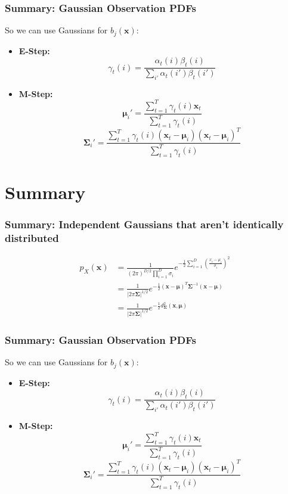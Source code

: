 \documentclass{beamer}
\begin{document}
\begin{frame}
  \frametitle{Summary: Gaussian Observation PDFs}

  So we can use Gaussians for $b_j(\mathbf{x})$:
  \begin{itemize}
  \item {\bf E-Step:}
    \[
    \gamma_t(i) = \frac{\alpha_t(i)\beta_t(i)}{\sum_{i'}\alpha_t(i')\beta_t(i')}
    \]
  \item {\bf M-Step:}
    \begin{displaymath}
      \bm{\mu}_{i}' = \frac{\sum_{t=1}^T\gamma_t(i)\mathbf{x}_{t}}{\sum_{t=1}^T\gamma_t(i)}
    \end{displaymath}
    \begin{displaymath}
      \mathbf{\Sigma}_{i}' = \frac{\sum_{t=1}^T\gamma_t(i)(\mathbf{x}_{t}-\bm{\mu}_{i})(\mathbf{x}_t-\bm{\mu}_i)^T}{\sum_{t=1}^T\gamma_t(i)}
    \end{displaymath}
  \end{itemize}
\end{frame}

\section[Summary]{Summary}
\setcounter{subsection}{1}

\begin{frame}
  \frametitle{Summary: Independent Gaussians that aren’t identically distributed}

  \begin{align*}
    p_X(\mathbf{x}) &= 
    \frac{1}{(2\pi)^{D/2}\prod_{i=1}^D\sigma_i}e^{-\frac{1}{2}\sum_{i=1}^D\left(\frac{x_i-\mu_i}{\sigma_i}\right)^2}
    \\
    &=
    \frac{1}{|2\pi\mathbf{\Sigma}|^{1/2}}e^{-\frac{1}{2}(\mathbf{x}-\bm{\mu})^T\mathbf{\Sigma}^{-1}(\mathbf{x}-\bm{\mu})}\\
    &=
    \frac{1}{|2\pi\mathbf{\Sigma}|^{1/2}}e^{-\frac{1}{2}d_{\mathbf{\Sigma}}^2(\mathbf{x},\bm{\mu})}
  \end{align*}
\end{frame}

\begin{frame}
  \frametitle{Summary: Gaussian Observation PDFs}

  So we can use Gaussians for $b_j(\mathbf{x})$:
  \begin{itemize}
  \item {\bf E-Step:}
    \[
    \gamma_t(i) = \frac{\alpha_t(i)\beta_t(i)}{\sum_{i'}\alpha_t(i')\beta_t(i')}
    \]
  \item {\bf M-Step:}
    \begin{displaymath}
      \bm{\mu}_{i}' = \frac{\sum_{t=1}^T\gamma_t(i)\mathbf{x}_{t}}{\sum_{t=1}^T\gamma_t(i)}
    \end{displaymath}
    \begin{displaymath}
      \mathbf{\Sigma}_{i}' = \frac{\sum_{t=1}^T\gamma_t(i)(\mathbf{x}_{t}-\bm{\mu}_{i})(\mathbf{x}_t-\bm{\mu}_i)^T}{\sum_{t=1}^T\gamma_t(i)}
    \end{displaymath}
  \end{itemize}
\end{frame}
\end{document}
